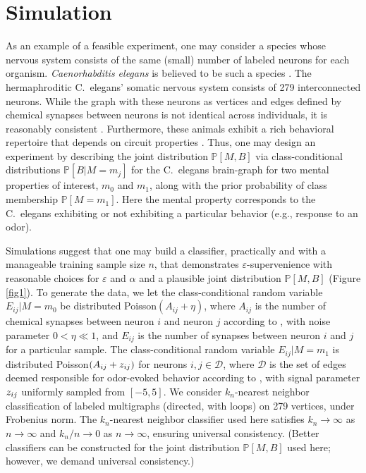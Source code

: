 \documentclass{article}
\newcommand{\mD}{\mathcal{D}}
\newcommand{\PP}{\mathbb{P}}           %
\providecommand{\tr}[1]{\textcolor{black}{#1}}
\begin{document}
\section{Simulation} %
\label{sec:sim}

As an example of a feasible experiment, one may consider a species whose nervous system consists of the same (small) number of labeled neurons for each organism. {\it Caenorhabditis elegans} is believed to be such a species \cite{Durbin87}. The hermaphroditic C.~elegans' somatic nervous system consists of 279 interconnected neurons. While the graph with these neurons as vertices and edges defined by chemical synapses between neurons is not identical across individuals, it is reasonably consistent \cite{Durbin87}. Furthermore, these animals exhibit a rich behavioral repertoire that depends on circuit properties \cite{deBonoMaricq05}. Thus, one may design an experiment by describing the joint distribution $\PP[M,B]$ via class-conditional distributions $\PP[B|M=m_j]$ for the C.~elegans brain-graph for two mental properties of interest, $m_0$ and $m_1$, along with the prior probability of class membership $\PP[M=m_1]$. Here the mental property corresponds to the C.~elegans exhibiting or not exhibiting a particular behavior (e.g., response to an odor).

Simulations suggest that one may build a classifier, practically and with a manageable training sample size $n$, that demonstrates $\varepsilon$-supervenience with reasonable choices for $\varepsilon$ and $\alpha$ and a plausible joint distribution $\PP[M,B]$ (Figure \ref{fig1}). To generate the data, we let the class-conditional random variable $E_{ij} | M=m_0$ be distributed Poisson$(A_{ij}+\eta)$, where $A_{ij}$ is the number of chemical synapses between neuron $i$ and neuron $j$ according to \cite{VarshneyChklovskii09}, with noise parameter $0<\eta \ll 1$, and $E_{ij}$ is the number of synapses between neuron $i$ and $j$ for a particular sample. The class-conditional random variable $E_{ij} | M=m_1$ is distributed Poisson$(A_{ij}+ \tr{z_{ij}})$ for neurons $i,j \in \mD$, where $\mD$ is the set of edges deemed responsible for odor-evoked behavior according to \cite{ChalasaniBargmann07}, with signal parameter $\tr{z_{ij}}$ uniformly sampled from $[-5,5]$. We consider $k_n$-nearest neighbor classification of labeled multigraphs (directed, with loops) on 279 vertices, under Frobenius norm. The $k_n$-nearest neighbor classifier used here satisfies $k_n \rightarrow \infty$ as $n \rightarrow \infty$ and $k_n/n \rightarrow 0$ as $n \rightarrow \infty$, ensuring universal consistency. (Better classifiers can be constructed for the joint distribution $\PP[M,B]$ used here; however, we demand universal consistency.)
\end{document}
